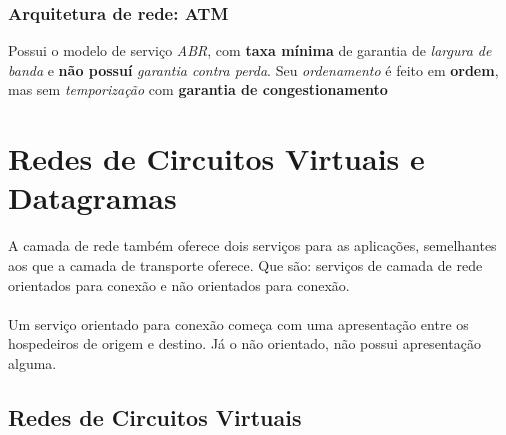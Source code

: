 \documentclass[a4paper, 12pt]{article}
\begin{document}
    \subsubsection{Arquitetura de rede: ATM}
    Possui o modelo de serviço \textit{ABR}, com \textbf{taxa mínima} de garantia de \textit{largura de banda} e \textbf{não possuí} 
    \textit{garantia contra perda}.
    Seu \textit{ordenamento} é feito em \textbf{ordem}, mas sem \textit{temporização} com \textbf{garantia de congestionamento} 

\newpage
\section{Redes de Circuitos Virtuais e Datagramas}
A camada de rede também oferece dois serviços para as aplicações, semelhantes aos que a camada de transporte oferece. Que são: serviços 
de camada de rede orientados para conexão e não orientados para conexão.
\\
\\
Um serviço orientado para conexão começa com uma apresentação entre os hospedeiros de origem e destino. Já o não orientado, não possui 
apresentação alguma.
\subsection{Redes de Circuitos Virtuais}
\end{document}
